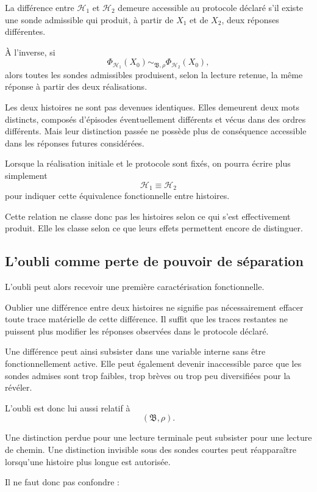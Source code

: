 La différence entre $\mathcal H_1$ et $\mathcal H_2$ demeure accessible au protocole déclaré s'il existe une sonde admissible qui produit, à partir de $X_1$ et de $X_2$, deux réponses différentes.

À l'inverse, si
\[
\Phi_{\mathcal H_1}(X_0)
\sim_{\mathfrak B,\rho}
\Phi_{\mathcal H_2}(X_0),
\]
alors toutes les sondes admissibles produisent, selon la lecture retenue, la même réponse à partir des deux réalisations.

Les deux histoires ne sont pas devenues identiques. Elles demeurent deux mots distincts, composés d'épisodes éventuellement différents et vécus dans des ordres différents. Mais leur distinction passée ne possède plus de conséquence accessible dans les réponses futures considérées.

Lorsque la réalisation initiale et le protocole sont fixés, on pourra écrire plus simplement
\[
\mathcal H_1\equiv\mathcal H_2
\]
pour indiquer cette équivalence fonctionnelle entre histoires.

Cette relation ne classe donc pas les histoires selon ce qui s'est effectivement produit. Elle les classe selon ce que leurs effets permettent encore de distinguer.

\subsection{L'oubli comme perte de pouvoir de séparation}

L'oubli peut alors recevoir une première caractérisation fonctionnelle.

Oublier une différence entre deux histoires ne signifie pas nécessairement effacer toute trace matérielle de cette différence. Il suffit que les traces restantes ne puissent plus modifier les réponses observées dans le protocole déclaré.

Une différence peut ainsi subsister dans une variable interne sans être fonctionnellement active. Elle peut également devenir inaccessible parce que les sondes admises sont trop faibles, trop brèves ou trop peu diversifiées pour la révéler.

L'oubli est donc lui aussi relatif à
\[
(\mathfrak B,\rho).
\]

Une distinction perdue pour une lecture terminale peut subsister pour une lecture de chemin. Une distinction invisible sous des sondes courtes peut réapparaître lorsqu'une histoire plus longue est autorisée.

Il ne faut donc pas confondre :

